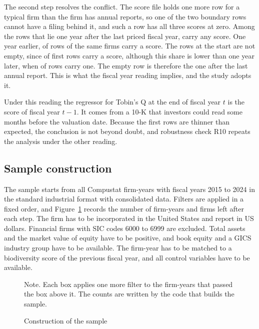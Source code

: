 \documentclass[12pt,a4paper]{article}
\newcommand{\tablenote}[1]{\par\smallskip\begin{minipage}{\linewidth}\footnotesize\setstretch{1.05}#1\end{minipage}}
\begin{document}
The second step resolves the conflict. The score file holds one more row for a typical firm than the firm has annual reports, so one of the two boundary rows cannot have a filing behind it, and such a row has all three scores at zero. Among the \nTrailRows{} rows that lie one year after the last priced fiscal year, \nTrailFilled{} carry any score. One year earlier, \nTrailBeforeFilled{} of \nTrailBefore{} rows of the same firms carry a score. The rows at the start are not empty, since \nFirstFilled{} of \nFirstRows{} first rows carry a score, although this share is lower than one year later, when \nFirstNextFilled{} of \nFirstNext{} rows carry one. The empty row is therefore the one after the last annual report. This is what the fiscal year reading implies, and the study adopts it.

Under this reading the regressor for Tobin's Q at the end of fiscal year $t$ is the score of fiscal year $t-1$. It comes from a 10-K that investors could read some months before the valuation date. Because the first rows are thinner than expected, the conclusion is not beyond doubt, and robustness check R10 repeats the analysis under the other reading.

\subsection{Sample construction}

The sample starts from all Compustat firm-years with fiscal years 2015 to 2024 in the standard industrial format with consolidated data. Filters are applied in a fixed order, and Figure~\ref{fig:sample} records the number of firm-years and firms left after each step. The firm has to be incorporated in the United States and report in US dollars. Financial firms with SIC codes 6000 to 6999 are excluded. Total assets and the market value of equity have to be positive, and book equity and a GICS industry group have to be available. The firm-year has to be matched to a biodiversity score of the previous fiscal year, and all control variables have to be available.

\begin{figure}[!htbp]
\centering

\caption{Construction of the sample}\label{fig:sample}
\tablenote{Note. Each box applies one more filter to the firm-years that passed the box above it. The counts are written by the code that builds the sample.}
\end{figure}
\end{document}
